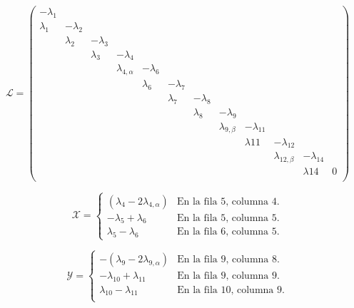 \begin{equation}
	\mathcal{L}=\left(\begin{smallmatrix}
		-\lambda_1& & & & & & & & & & & \\								%
		\lambda_1&-\lambda_2& & & & & & & & & & \\						%
		&\lambda_2&-\lambda_3& & & & & & & & & \\						%
		& & \lambda_3&-\lambda_4& & & & & & & & \\						%
		& & &\lambda_{4, \alpha}&-\lambda_6& & & & & & & \\				%
		& & & &\lambda_6 &-\lambda_7& & & & & & \\						%
		& & & & &\lambda_7&-\lambda_8& & & & & \\						%
		& & & & & &\lambda_8&-\lambda_9& & & & \\						%
		& & & & & & &\lambda_{9, \beta}&-\lambda_{11}& & & \\			%
		& & & & & & & &\lambda{11}&-\lambda_{12}& & \\					%
		& & & & & & & & &\lambda_{12, \beta}&-\lambda_{14}&\\			%
		& & & & & & & & & &\lambda{14}& 0\\								%
	\end{smallmatrix}\right)
\end{equation}\label{matriz_determinista_alternativa}

\begin{equation}
	\mathcal{X}=\begin{cases}
		(\lambda_4-2\lambda_{4, \alpha}) & \textrm{En la fila 5, columna 4.}\\
		-\lambda_5+\lambda_6 & \textrm{En la fila 5, columna 5.}\\
		\lambda_5-\lambda_6 & \textrm{En la fila 6, columna 5.}
	\end{cases}
\end{equation}\label{matriz_estocastica_x}

\begin{equation}
	\mathcal{Y}=\begin{cases}
		-(\lambda_9-2\lambda_{9, \alpha}) & \textrm{En la fila 9, columna 8.}\\
		-\lambda_{10}+\lambda_{11} & \textrm{En la fila 9, columna 9.} \\
		\lambda_{10}-\lambda_{11} & \textrm{En la fila 10, columna 9.} \\
	\end{cases}
\end{equation}\label{matriz_estocastica_y}

